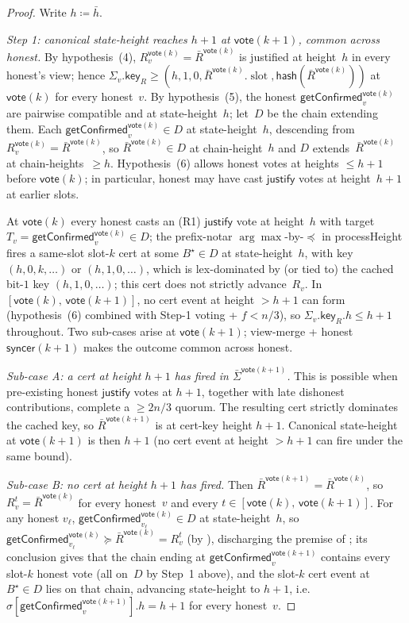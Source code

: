 \documentclass{article}
\newcommand{\slot}[0]{\ensuremath{\operatorname{\mathrm{slot}}}}
\newcommand{\just}{\ensuremath{\mathsf{justify}}\xspace}
\newcommand{\hash}{\mathsf{hash}}
\newcommand{\key}{\mathsf{key}}
\newcommand{\syncer}{\mathsf{syncer}}
\newcommand{\vote}{\mathsf{vote}}
\newcommand{\comm}[1]{\bar{#1}}
\newcommand{\processHeight}{\textsf{processHeight}\xspace}
\newcommand{\getConfirmed}{\textsf{getConfirmed}\xspace}
\theoremstyle{plain}
\theoremstyle{definition}
\theoremstyle{remark}
\begin{document}
\begin{proof}
Write $h \coloneqq \comm{h}$.

\emph{Step 1: canonical state-height reaches $h+1$ at $\vote(k+1)$, common across honest.}
By hypothesis~(4), $R_v^{\vote(k)} = \comm{R}^{\vote(k)}$ is justified at height~$h$ in every honest's view; hence $\Sigma_v.\key_R \geq (h, 1, 0, \comm{R}^{\vote(k)}.\slot, \hash(\comm{R}^{\vote(k)}))$ at $\vote(k)$ for every honest~$v$. By hypothesis~(5), the honest $\getConfirmed_v^{\vote(k)}$ are pairwise compatible and at state-height~$h$; let~$D$ be the chain extending them. Each $\getConfirmed_v^{\vote(k)} \in D$ at state-height~$h$, descending from $R_v^{\vote(k)} = \comm{R}^{\vote(k)}$, so $\comm{R}^{\vote(k)} \in D$ at chain-height~$h$ and $D$ extends~$\comm{R}^{\vote(k)}$ at chain-heights~$\geq h$. Hypothesis~(6) allows honest votes at heights $\leq h+1$ before $\vote(k)$; in particular, honest may have cast \just votes at height~$h+1$ at earlier slots.

At $\vote(k)$ every honest casts an (R1) \just vote at height~$h$ with target $T_v = \getConfirmed_v^{\vote(k)} \in D$; the prefix-notar $\arg\max$-by-$\preceq$ in \processHeight{} fires a same-slot slot-$k$ cert at some $B^\star \in D$ at state-height~$h$, with key $(h, 0, k, \ldots)$ or $(h, 1, 0, \ldots)$, which is lex-dominated by (or tied to) the cached bit-$1$ key $(h, 1, 0, \ldots)$; this cert does not strictly advance~$R_v$. In $[\vote(k),\, \vote(k+1)]$, no cert event at height $>h+1$ can form (hypothesis~(6) combined with Step-1 voting + $f<n/3$), so $\Sigma_v.\key_R.h \leq h+1$ throughout. Two sub-cases arise at $\vote(k+1)$; view-merge + honest $\syncer(k+1)$ makes the outcome common across honest.

\emph{Sub-case A: a cert at height $h+1$ has fired in $\comm{\Sigma}^{\vote(k+1)}$.}
This is possible when pre-existing honest \just votes at $h+1$, together with late dishonest contributions, complete a $\geq 2n/3$ quorum. The resulting cert strictly dominates the cached key, so $\comm{R}^{\vote(k+1)}$ is at cert-key height $h+1$. Canonical state-height at $\vote(k+1)$ is then $h+1$ (no cert event at height $>h+1$ can fire under the same bound).

\emph{Sub-case B: no cert at height $h+1$ has fired.}
Then $\comm{R}^{\vote(k+1)} = \comm{R}^{\vote(k)}$, so $R_v^t = \comm{R}^{\vote(k)}$ for every honest~$v$ and every $t \in [\vote(k),\, \vote(k+1)]$. For any honest $v_\ell$, $\getConfirmed_{v_\ell}^{\vote(k)} \in D$ at state-height~$h$, so $\getConfirmed_{v_\ell}^{\vote(k)} \succeq \comm{R}^{\vote(k)} = R_v^t$ (by ), discharging the premise of ; its conclusion gives that the chain ending at $\getConfirmed_v^{\vote(k+1)}$ contains every slot-$k$ honest vote (all on~$D$ by Step~1 above), and the slot-$k$ cert event at $B^\star \in D$ lies on that chain, advancing state-height to $h+1$, i.e.\ $\sigma[\getConfirmed_v^{\vote(k+1)}].h = h + 1$ for every honest~$v$.


\end{proof}
\end{document}
